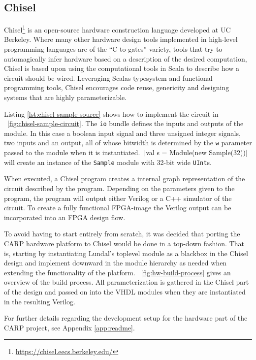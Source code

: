 \subsection{Chisel}
\label{sec:chisel}

Chisel\footnote{\url{https://chisel.eecs.berkeley.edu/}} is an open-source
hardware construction language developed at UC Berkeley. Where many other
hardware design tools implemented in high-level programming languages are of the
``C-to-gates'' variety, tools that try to automagically infer hardware based on
a description of the desired computation, Chisel is based upon using the
computational tools in Scala to describe how a circuit should be wired.
Leveraging Scalas typesystem and functional programming tools, Chisel encourages
code reuse, genericity and designing systems that are highly parameterizable.

Listing \ref{lst:chisel-sample-source} shows how to implement the circuit in
\figurename~\ref{fig:chisel-sample-circuit}. The \texttt{io} bundle defines the
inputs and outputs of the module. In this case a boolean input signal and three
unsigned integer signals, two inputs and an output, all of whose bitwidth is
determined by the \texttt{w} parameter passed to the module when it is
instantiated. \texttt|val s = Module(new Sample(32))| will create an
instance of the \texttt{Sample} module with 32-bit wide \texttt{UInt}s.

When executed, a Chisel program creates a internal graph representation of the
circuit described by the program. Depending on the parameters given to the
program, the program will output either Verilog or a C++ simulator of the
circuit. To create a fully functional FPGA-image the Verilog output can be
incorporated into an FPGA design flow.

To avoid having to start entirely from scratch, it was decided that porting the
CARP hardware platform to Chisel would be done in a top-down fashion. That is,
starting by instantiating Lundal's toplevel module as a blackbox in the Chisel
design and implement downward in the module hierarchy as needed when extending
the functionality of the platform. \figurename~\ref{fig:hw-build-process} gives
an overview of the build process. All parameterization is gathered in the Chisel
part of the design and passed on into the VHDL modules when they are
instantiated in the resulting Verilog.

For further details regarding the development setup for the hardware part of the
CARP project, see Appendix \ref{app:readme}.

